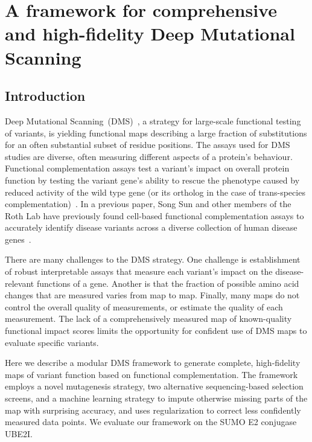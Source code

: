 

\chapter[A comprehensive high-fidelity DMS framework]{A framework for comprehensive and high-fidelity Deep Mutational Scanning}

\section{Introduction}


Deep Mutational Scanning~(DMS)~\cite{fowler_high-resolution_2010}, a strategy for large-scale functional testing of variants, is yielding functional maps describing a large fraction of substitutions for an often substantial subset of residue positions. The assays used for DMS studies are diverse, often measuring different aspects of a protein's behaviour. Functional complementation assays test a variant's impact on overall protein function by testing the variant gene's ability to rescue the phenotype caused by reduced activity of the wild type gene (or its ortholog in the case of trans-species complementation)~\cite{lee_complementation_1987,osborn_rescuing_2007}. In a previous paper, Song Sun and other members of the Roth Lab have previously found cell-based functional complementation assays to accurately identify disease variants across a diverse collection of human disease genes~\cite{sun_extended_2016}. 

There are many challenges to the DMS strategy.  One challenge is establishment of robust interpretable assays that measure each variant's impact on the disease-relevant functions of a gene. Another is that the fraction of possible amino acid changes that are measured varies from map to map. Finally, many maps do not control the overall quality of measurements, or estimate the quality of each measurement. The lack of a comprehensively measured map of known-quality functional impact scores limits the opportunity for confident use of DMS maps to evaluate specific variants.

Here we describe a modular DMS framework to generate  complete, high-fidelity maps of variant function based on functional complementation. The framework employs a novel mutagenesis strategy, two alternative sequencing-based selection screens, and a machine learning strategy to impute  otherwise missing parts of the map with surprising accuracy, and uses regularization to correct less confidently measured data points. We evaluate our framework on the SUMO E2 conjugase UBE2I.


